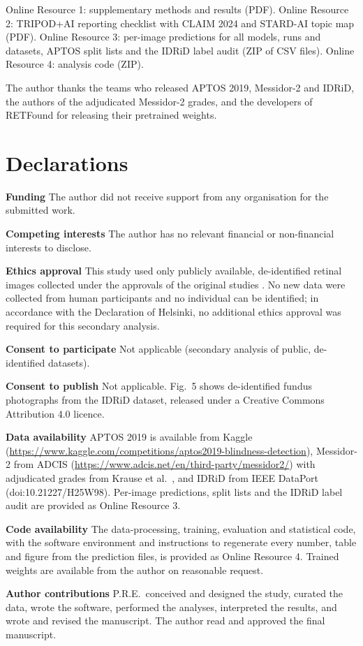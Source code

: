 \documentclass[pdflatex,sn-basic,Numbered]{sn-jnl}
\begin{document}
\backmatter

Online Resource 1: supplementary methods and results (PDF). Online Resource 2: TRIPOD+AI reporting checklist with CLAIM 2024 and STARD-AI topic map (PDF). Online Resource 3: per-image predictions for all models, runs and datasets, APTOS split lists and the IDRiD label audit (ZIP of CSV files). Online Resource 4: analysis code (ZIP).

The author thanks the teams who released APTOS 2019, Messidor-2 and IDRiD, the authors of the adjudicated Messidor-2 grades, and the developers of RETFound for releasing their pretrained weights.

\section*{Declarations}

\textbf{Funding} The author did not receive support from any organisation for the submitted work.

\textbf{Competing interests} The author has no relevant financial or non-financial interests to disclose.

\textbf{Ethics approval} This study used only publicly available, de-identified retinal images collected under the approvals of the original studies \cite{aptos2019,decenciere2014,krause2018,porwal2018}. No new data were collected from human participants and no individual can be identified; in accordance with the Declaration of Helsinki, no additional ethics approval was required for this secondary analysis.

\textbf{Consent to participate} Not applicable (secondary analysis of public, de-identified datasets).

\textbf{Consent to publish} Not applicable. Fig.~5 shows de-identified fundus photographs from the IDRiD dataset, released under a Creative Commons Attribution 4.0 licence.

\textbf{Data availability} APTOS 2019 is available from Kaggle (\url{https://www.kaggle.com/competitions/aptos2019-blindness-detection}), Messidor-2 from ADCIS (\url{https://www.adcis.net/en/third-party/messidor2/}) with adjudicated grades from Krause et al.\ \cite{krause2018}, and IDRiD from IEEE DataPort (doi:10.21227/H25W98). Per-image predictions, split lists and the IDRiD label audit are provided as Online Resource 3.

\textbf{Code availability} The data-processing, training, evaluation and statistical code, with the software environment and instructions to regenerate every number, table and figure from the prediction files, is provided as Online Resource 4. Trained weights are available from the author on reasonable request.

\textbf{Author contributions} P.R.E.\ conceived and designed the study, curated the data, wrote the software, performed the analyses, interpreted the results, and wrote and revised the manuscript. The author read and approved the final manuscript.


\end{document}
